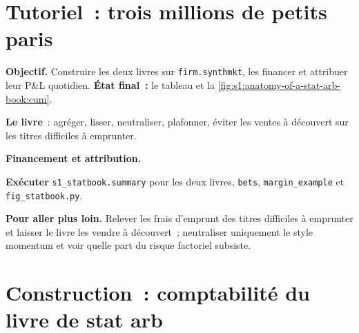 \section{Tutoriel~: trois millions de petits paris}\label{tut:s1:anatomy-of-a-stat-arb-book:tut}

\begin{tutorial}
\textbf{Objectif.} Construire les deux livres sur \texttt{firm.synthmkt}, les financer et attribuer leur P\&L quotidien. \textbf{État final~:} le tableau et
la \cref{fig:s1:anatomy-of-a-stat-arb-book:cum}.
\begin{tutsteps}
\item \textbf{Le livre}~: agréger, lisser, neutraliser, plafonner, éviter les ventes à découvert sur les titres difficiles à emprunter.
\label{lst:s1:anatomy-of-a-stat-arb-book:book}
\item \textbf{Financement et attribution.}
\label{lst:s1:anatomy-of-a-stat-arb-book:fin}
\item \textbf{Exécuter} \texttt{s1\_statbook.summary} pour les deux livres, \texttt{bets}, \texttt{margin\_example} et \texttt{fig\_statbook.py}.
\end{tutsteps}
\textbf{Pour aller plus loin.} Relever les frais d'emprunt des titres difficiles à emprunter et laisser le livre les vendre à découvert~; neutraliser uniquement le style momentum
et voir quelle part du risque factoriel subsiste.
\end{tutorial}

\section{Construction~: comptabilité du livre de stat arb}\label{bld:s1:anatomy-of-a-stat-arb-book:statbook}

